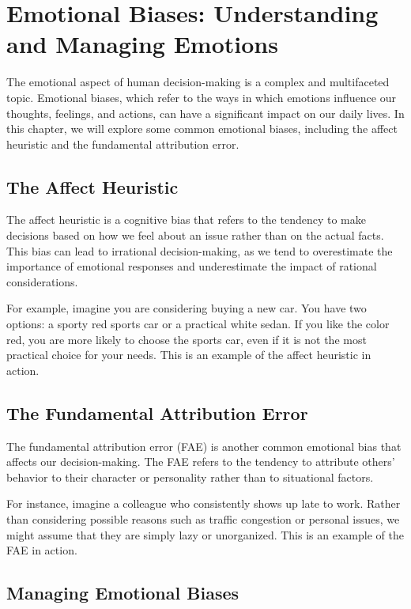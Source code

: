 \chapter{Emotional Biases: Understanding and Managing Emotions}

The emotional aspect of human decision-making is a complex and multifaceted topic. Emotional biases, which refer to the ways in which emotions influence our thoughts, feelings, and actions, can have a significant impact on our daily lives. In this chapter, we will explore some common emotional biases, including the affect heuristic and the fundamental attribution error.

\section{The Affect Heuristic}

The affect heuristic is a cognitive bias that refers to the tendency to make decisions based on how we feel about an issue rather than on the actual facts. This bias can lead to irrational decision-making, as we tend to overestimate the importance of emotional responses and underestimate the impact of rational considerations.

For example, imagine you are considering buying a new car. You have two options: a sporty red sports car or a practical white sedan. If you like the color red, you are more likely to choose the sports car, even if it is not the most practical choice for your needs. This is an example of the affect heuristic in action.

\section{The Fundamental Attribution Error}

The fundamental attribution error (FAE) is another common emotional bias that affects our decision-making. The FAE refers to the tendency to attribute others' behavior to their character or personality rather than to situational factors.

For instance, imagine a colleague who consistently shows up late to work. Rather than considering possible reasons such as traffic congestion or personal issues, we might assume that they are simply lazy or unorganized. This is an example of the FAE in action.

\section{Managing Emotional Biases}

